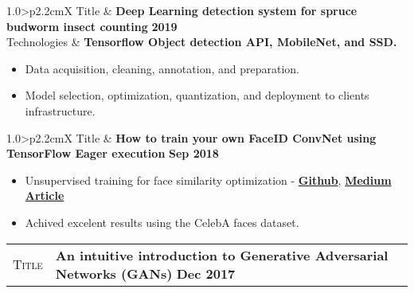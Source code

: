 \documentclass[9pt, a4paper, oneside, final]{scrartcl} %
\newcommand{\gray}{\rowcolor[gray]{.90}} %
\begin{document}
\begin{center}
\begin{tabularx}{1.0\linewidth}{>{\raggedleft\scshape}p{2.2cm}X}
\gray Title & \textbf{Deep Learning detection system for spruce budworm insect counting} \hfill \textbf{2019}\\
\gray Technologies & \textbf{Tensorflow Object detection API, MobileNet, and SSD.}
\end{tabularx}
\end{center}

\begin{itemize}\itemsep1.2pt \parskip1.5pt 
\item Data acquisition, cleaning, annotation, and preparation. 
\item Model selection, optimization, quantization, and deployment to clients infrastructure. 
\end{itemize}


\begin{center}
\begin{tabularx}{1.0\linewidth}{>{\raggedleft\scshape}p{2.2cm}X}
\gray Title & \textbf{How to train your own FaceID ConvNet using TensorFlow Eager execution} \hfill \textbf{Sep 2018}\\
\end{tabularx}
\end{center}

\begin{itemize}\itemsep1.2pt \parskip0pt 
\item Unsupervised training for face similarity optimization - \textbf{\href{https://github.com/sthalles/face-similarity}{Github}}, \textbf{\href{https://medium.com/free-code-camp/how-to-train-your-own-faceid-cnn-using-tensorflow-eager-execution-6905afe4fd5a?source=friends_link&sk=f366d6fdad9dfda8ac2337ca28912f49}{Medium Article}} 
\item Achived excelent results using the CelebA faces dataset.
\end{itemize}


\begin{center}
\begin{tabularx}{1.0\linewidth}{>{\raggedleft\scshape}p{2.2cm}X}
\gray Title & \textbf{An intuitive introduction to Generative Adversarial Networks (GANs)} \hfill \textbf{Dec 2017}\\
\end{tabularx}
\end{center}
\end{document}
